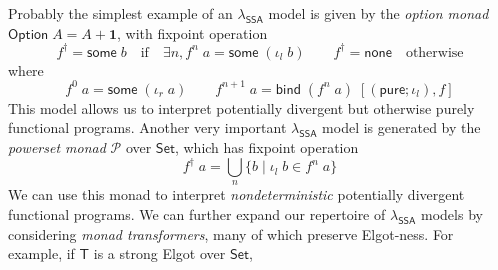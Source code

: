 \documentclass[acmsmall,screen,review]{acmart}
\newcommand{\mc}[1]{\ensuremath{\mathcal{#1}}}
\newcommand{\mb}[1]{\ensuremath{\mathbf{#1}}}
\newcommand{\ms}[1]{\ensuremath{\mathsf{#1}}}
\newcommand{\isotopessa}{\(\lambda_{\ms{SSA}}\)}
\begin{document}
Probably the simplest example of an \isotopessa{} model is given by the
\emph{option monad} $\ms{Option}\;A = A + \mb{1}$, with fixpoint operation
$$
  f^\dagger = \ms{some}\;b \quad \text{if} \quad \exists n, f^n\;a = \ms{some}\;(\iota_l\;b)
  \qquad
  f^\dagger = \ms{none} \quad \text{otherwise}
$$
where
$$
  f^0\;a = \ms{some}\;(\iota_r\;a) \qquad
  f^{n + 1}\;a = \ms{bind}\;(f^{n}\;a)\;[(\ms{pure};\iota_l), f] 
$$
This model allows us to interpret potentially divergent but otherwise purely functional programs.
Another very important \isotopessa{} model is generated by the \emph{powerset monad} $\mc{P}$ over
\ms{Set}, which has fixpoint operation
$$
  f^\dagger\;a = \bigcup_n\{b \mid \iota_l\;b \in f^n\;a\}
$$
We can use this monad to interpret \emph{nondeterministic} potentially divergent functional
programs. We can further expand our repertoire of \isotopessa{} models by considering \emph{monad
transformers}, many of which preserve Elgot-ness. For example, if $\ms{T}$ is a strong Elgot over
\ms{Set},
\end{document}
